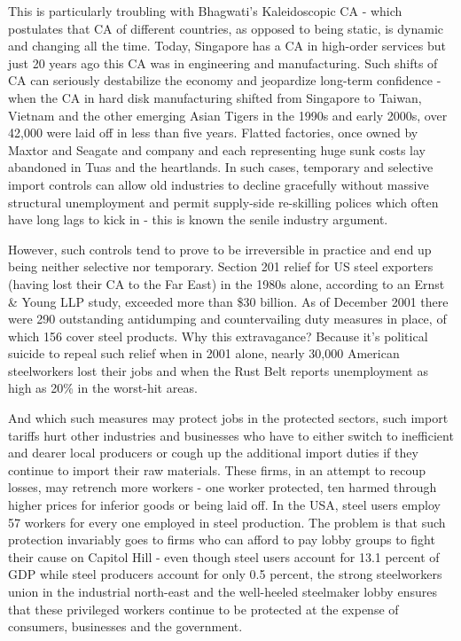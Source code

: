 This is particularly troubling with Bhagwati's Kaleidoscopic CA - which postulates that CA of different countries, as opposed to being static, is dynamic and changing all the time. Today, Singapore has a CA in high-order services but just 20 years ago this CA was in engineering and manufacturing. Such shifts of CA can seriously destabilize the economy and jeopardize long-term confidence - when the CA in hard disk manufacturing shifted from Singapore to Taiwan, Vietnam and the other emerging Asian Tigers in the 1990s and early 2000s, over 42,000 were laid off in less than five years. Flatted factories, once owned by Maxtor and Seagate and company and each representing huge sunk costs lay abandoned in Tuas and the heartlands. In such cases, temporary and selective import controls can allow old industries to decline gracefully without massive structural unemployment and permit supply-side re-skilling polices which often have long lags to kick in - this is known the senile industry argument.

However, such controls tend to prove to be irreversible in practice and end up being neither selective nor temporary. Section 201 relief for US steel exporters (having lost their CA to the Far East) in the 1980s alone, according to an Ernst \& Young LLP study, exceeded more than \$30 billion. As of December 2001 there were 290 outstanding antidumping and countervailing duty measures in place, of which 156 cover steel products. Why this extravagance? Because it's political suicide to repeal such relief when in 2001 alone, nearly 30,000 American steelworkers lost their jobs and when the Rust Belt reports unemployment as high as 20\% in the worst-hit areas.

And which such measures may protect jobs in the protected sectors, such import tariffs hurt other industries and businesses who have to either switch to inefficient and dearer local producers or cough up the additional import duties if they continue to import their raw materials. These firms, in an attempt to recoup losses, may retrench more workers - one worker protected, ten harmed through higher prices for inferior goods or being laid off. In the USA, steel users employ 57 workers for every one employed in steel production. The problem is that such protection invariably goes to firms who can afford to pay lobby groups to fight their cause on Capitol Hill - even though steel users account for 13.1 percent of GDP while steel producers account for only 0.5 percent, the strong steelworkers union in the industrial north-east and the well-heeled steelmaker lobby ensures that these privileged workers continue to be protected at the expense of consumers, businesses and the government.

